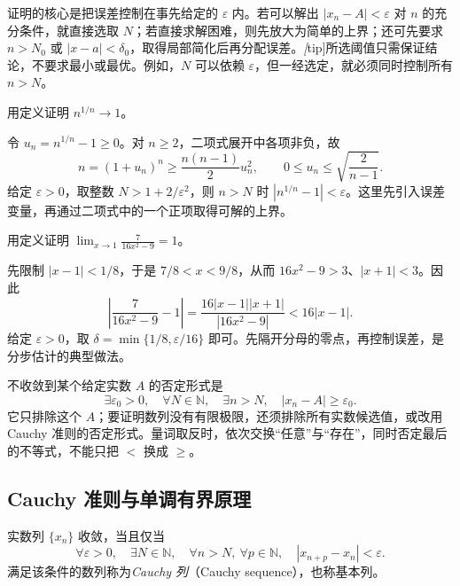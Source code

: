证明的核心是把误差控制在事先给定的 $\varepsilon$ 内。若可以解出 $|x_n-A|<\varepsilon$ 对 $n$ 的充分条件，就直接选取 $N$；若直接求解困难，则先放大为简单的上界；还可先要求 $n>N_0$ 或 $|x-a|<\delta_0$，取得局部简化后再分配误差。\emph[tip]{所选阈值只需保证结论，不要求最小或最优。}例如，$N$ 可以依赖 $\varepsilon$，但一经选定，就必须同时控制所有 $n>N$。

\begin{example}
\label{ex:pei-root-n-definition}
用定义证明 $n^{1/n}\to1$。
\end{example}
\begin{solve}
令 $u_n=n^{1/n}-1\ge0$。对 $n\ge2$，二项式展开中各项非负，故
\[
    n=(1+u_n)^n\ge\frac{n(n-1)}2u_n^2,
    \qquad 0\le u_n\le\sqrt{\frac2{n-1}}.
\]
给定 $\varepsilon>0$，取整数 $N>1+2/\varepsilon^2$，则 $n>N$ 时 $|n^{1/n}-1|<\varepsilon$。这里先引入误差变量，再通过二项式中的一个正项取得可解的上界。
\end{solve}

\begin{example}
\label{ex:pei-delta-stages}
用定义证明 $\displaystyle\lim_{x\to1}\frac7{16x^2-9}=1$。
\end{example}
\begin{solve}
先限制 $|x-1|<1/8$，于是 $7/8<x<9/8$，从而 $16x^2-9>3$、$|x+1|<3$。因此
\[
    \left|\frac7{16x^2-9}-1\right|
    =\frac{16|x-1||x+1|}{|16x^2-9|}<16|x-1|.
\]
给定 $\varepsilon>0$，取 $\delta=\min\{1/8,\varepsilon/16\}$ 即可。先隔开分母的零点，再控制误差，是分步估计的典型做法。
\end{solve}

不收敛到某个给定实数 $A$ 的否定形式是
\[
    \exists\varepsilon_0>0,\quad\forall N\in\mathbb{N},\quad
    \exists n>N,\quad |x_n-A|\ge\varepsilon_0.
\]
它只排除这个 $A$；要证明数列没有有限极限，还须排除所有实数候选值，或改用 Cauchy 准则的否定形式。量词取反时，依次交换“任意”与“存在”，同时否定最后的不等式，不能只把 $<$ 换成 $\ge$。

\subsection{Cauchy 准则与单调有界原理}

\begin{theorem}
\label{thm:pei-cauchy}
实数列 $\{x_n\}$ 收敛，当且仅当
\begin{equation}
    \forall\varepsilon>0,\quad\exists N\in\mathbb{N},\quad
    \forall n>N,\ \forall p\in\mathbb{N},\quad
    |x_{n+p}-x_n|<\varepsilon.
    \label{eq:pei-cauchy}
\end{equation}
满足该条件的数列称为\emph{Cauchy 列}（Cauchy sequence），也称基本列。
\end{theorem}

